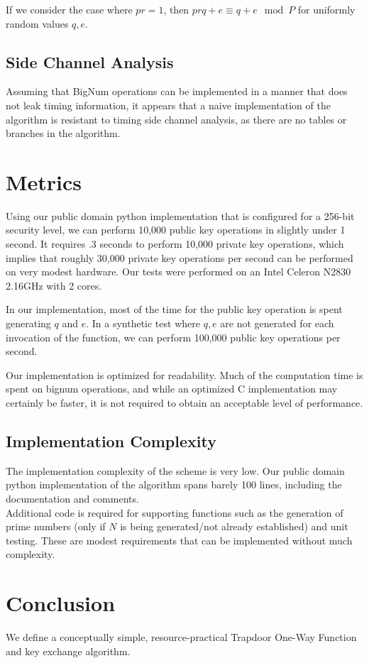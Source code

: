 \documentclass[preprint]{iacrtrans}
\begin{document}
If we consider the case where $pr = 1$, then $prq + e \equiv q + e \mod P$ for uniformly random values $q, e$. 

\subsection{Side Channel Analysis}
Assuming that BigNum operations can be implemented in a manner that does not leak timing information, it appears that a naive implementation of the algorithm is resistant to timing side channel analysis, as there are no tables or branches in the algorithm.

\section{Metrics}
Using our public domain python implementation that is configured for a 256-bit security level, we can perform 10,000 public key operations in slightly under 1 second. It requires .3 seconds to perform 10,000 private key operations, which implies that roughly 30,000 private key operations per second can be performed on very modest hardware. Our tests were performed on an Intel Celeron N2830 2.16GHz with 2 cores. 

In our implementation, most of the time for the public key operation is spent generating $q$ and $e$. In a synthetic test where $q, e$ are not generated for each invocation of the function, we can perform 100,000 public key operations per second.

Our implementation is optimized for readability. Much of the computation time is spent on bignum operations, and while an optimized C implementation may certainly be faster, it is not required to obtain an acceptable level of performance. 

\subsection{Implementation Complexity}
The implementation complexity of the scheme is very low. Our public domain python implementation of the algorithm spans barely 100 lines, including the documentation and comments.\\

Additional code is required for supporting functions such as the generation of prime numbers (only if $N$ is being generated/not already established) and unit testing. These are modest requirements that can be implemented without much complexity. \\

\section{Conclusion}
We define a conceptually simple, resource-practical Trapdoor One-Way Function and key exchange algorithm. 
\end{document}
